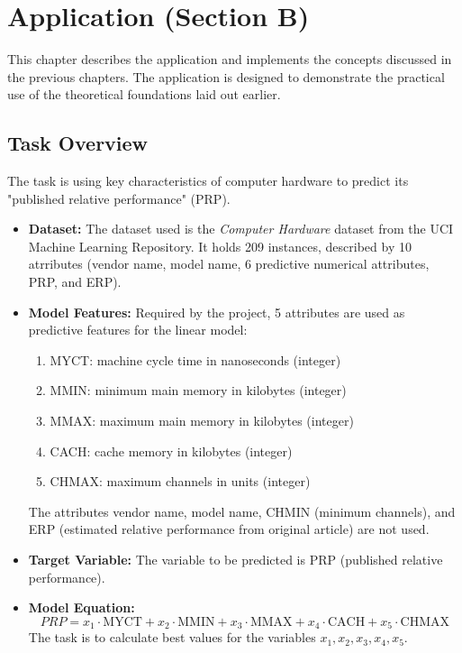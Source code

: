 \chapter{Application (Section B)}
\label{chap:application}

This chapter describes the application and implements the concepts discussed in the previous chapters. The application is designed to demonstrate the practical use of the theoretical foundations laid out earlier.

\section{Task Overview}
\label{sec:task-overview}
The task is using key characteristics of computer hardware to predict its "published relative performance" (PRP).
\begin{itemize}
    \item \textbf{Dataset:} The dataset used is the \textit{Computer Hardware} dataset from the UCI Machine Learning Repository. It holds 209 instances, described by 10 atrributes (vendor name, model name, 6 predictive numerical attributes, PRP, and ERP).
    \item \textbf{Model Features:} Required by the project, 5 attributes are used as predictive features for the linear model:
    \begin{enumerate}
        \item MYCT: machine cycle time in nanoseconds (integer)
        \item MMIN: minimum main memory in kilobytes (integer)
        \item MMAX: maximum main memory in kilobytes (integer)
        \item CACH: cache memory in kilobytes (integer)
        \item CHMAX: maximum channels in units (integer)
    \end{enumerate}
     The attributes vendor name, model name, CHMIN (minimum channels), and ERP (estimated relative performance from original article) are not used.
    \item \textbf{Target Variable:} The variable to be predicted is PRP (published relative performance).
    \item \textbf{Model Equation:}  $$ PRP = x_1 \cdot \text{MYCT} + x_2 \cdot \text{MMIN} + x_3 \cdot \text{MMAX} + x_4 \cdot \text{CACH} + x_5 \cdot \text{CHMAX} $$
    The task is to calculate best values for the variables $x_1, x_2, x_3, x_4, x_5$.
\end{itemize}

